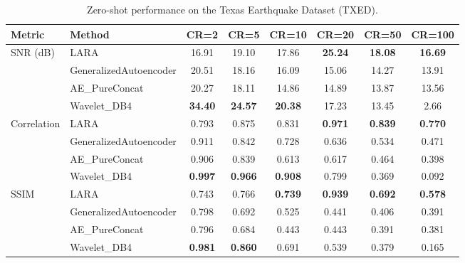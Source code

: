 \documentclass[fleqn,10pt]{wlscirep}
\begin{document}
\begin{table}[!t]
\centering
\caption{Zero-shot performance on the Texas Earthquake Dataset (TXED).}
\label{tab:zero-shot-texas}
\begin{tabular}{l l c c c c c c}
\toprule
\textbf{Metric} & \textbf{Method} & \textbf{CR=2} & \textbf{CR=5} & \textbf{CR=10} & \textbf{CR=20} & \textbf{CR=50} & \textbf{CR=100} \\
\midrule
SNR (dB) & {LARA} & {16.91} & {19.10} & {17.86} & \textbf{25.24} & \textbf{18.08} & \textbf{16.69} \\
 & GeneralizedAutoencoder & 20.51 & 18.16 & 16.09 & 15.06 & 14.27 & 13.91 \\
 & AE\_PureConcat & 20.27 & 18.11 & 14.86 & 14.89 & 13.87 & 13.56 \\
 & Wavelet\_DB4 & \textbf{34.40} &\textbf{ 24.57} & \textbf{20.38} & 17.23 & 13.45 & 2.66 \\
\midrule
Correlation & {LARA} & {0.793} &{0.875} & {0.831} & \textbf{0.971} & \textbf{0.839} & \textbf{0.770} \\
 & GeneralizedAutoencoder & 0.911 & 0.842 & 0.728 & 0.636 & 0.534 & 0.471 \\
 & AE\_PureConcat & 0.906 & 0.839 & 0.613 & 0.617 & 0.464 & 0.398 \\
 & Wavelet\_DB4 & \textbf{0.997} & \textbf{0.966} & \textbf{0.908} & 0.799 & 0.369 & 0.092 \\
\midrule
SSIM & {LARA} & {0.743} & {0.766} & \textbf{0.739} & \textbf{0.939} & \textbf{0.692} & \textbf{0.578} \\
 & GeneralizedAutoencoder & 0.798 & 0.692 & 0.525 & 0.441 & 0.406 & 0.391 \\
 & AE\_PureConcat & 0.796 & 0.684 & 0.443 & 0.443 & 0.391 & 0.381 \\
 & Wavelet\_DB4 & \textbf{0.981} & \textbf{0.860} & {0.691} & 0.539 & 0.379 & 0.165 \\
\bottomrule
\end{tabular}
\end{table}
\end{document}
